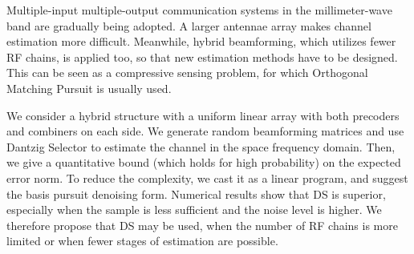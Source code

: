 
\starttitle [title={Abstract}]

Multiple-input multiple-output communication systems in the millimeter-wave band are gradually being adopted.
A larger antennae array makes channel estimation more difficult.
Meanwhile, hybrid beamforming, which utilizes fewer RF chains, is applied too, so that new estimation methods have to be designed.
This can be seen as a compressive sensing problem, for which Orthogonal Matching Pursuit is usually used.

We consider a hybrid structure with a uniform linear array with both precoders and combiners on each side.
We generate random beamforming matrices and use Dantzig Selector to estimate the channel in the space frequency domain.
Then, we give a quantitative bound (which holds for high probability) on the expected error norm.
To reduce the complexity, we cast it as a linear program, and suggest the basis pursuit denoising form.
Numerical results show that DS is superior, especially when the sample is less sufficient and the noise level is higher.
We therefore propose that DS may be used, when the number of RF chains is more limited or when fewer stages of estimation are possible.




\stoptitle
